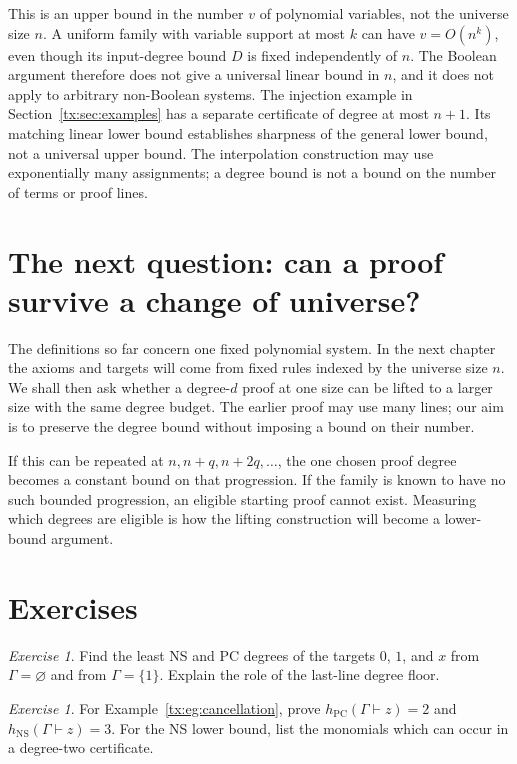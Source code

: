 \documentclass[11pt,a4paper,oneside,openany]{book}
\theoremstyle{definition}\newtheorem{definition}[theorem]{Definition}
\theoremstyle{remark}\newtheorem{remark}[theorem]{Remark}
\newcommand{\NS}{\mathrm{NS}}\newcommand{\PC}{\mathrm{PC}}
\newtheorem{exercise}[theorem]{Exercise}
\numberwithin{equation}{chapter}
\begin{document}
This is an upper bound in the number $v$ of polynomial variables,
not the universe size $n$. A uniform family with variable support at
most $k$ can have $v=O(n^k)$, even though its input-degree bound $D$
is fixed independently of $n$. The Boolean argument therefore does
not give a universal linear bound in $n$, and it does not apply to
arbitrary non-Boolean systems. The injection example in
Section~\ref{tx:sec:examples} has a separate certificate of degree
at most $n+1$. Its matching linear lower bound establishes sharpness
of the general lower bound, not a universal upper bound.
The interpolation construction may use exponentially many assignments;
a degree bound is not a bound on the number of terms or proof lines.

\section{The next question: can a proof survive a change of universe?}
The definitions so far concern one fixed polynomial system. In the
next chapter the axioms and targets will come from fixed rules indexed
by the universe size $n$. We shall then ask whether a degree-$d$ proof
at one size can be lifted to a larger size with the same degree budget.
The earlier proof may use many lines; our aim is to preserve the
degree bound without imposing a bound on their number.

If this can be repeated at $n,n+q,n+2q,\ldots$, the one chosen proof
degree becomes a constant bound on that progression. If the family
is known to have no such bounded progression, an eligible starting
proof cannot exist. Measuring which degrees are eligible is how the
lifting construction will become a lower-bound argument.

\section{Exercises}
\begin{exercise}\label{tx:ex:zero-constant}
Find the least NS and PC degrees of the targets $0$, $1$, and $x$ from
$\Gamma=\varnothing$ and from $\Gamma=\{1\}$. Explain the role of the
last-line degree floor.
\end{exercise}
\par\medskip

\begin{exercise}\label{tx:ex:small-gap}
For Example~\ref{tx:eg:cancellation}, prove
$h_{\PC}(\Gamma\vdash z)=2$ and
$h_{\NS}(\Gamma\vdash z)=3$. For the NS lower bound, list the monomials
which can occur in a degree-two certificate.
\end{exercise}
\par\medskip
\end{document}
